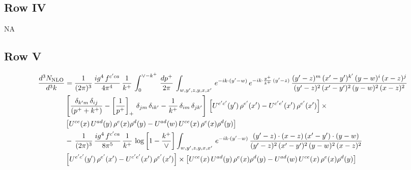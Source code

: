 \documentclass[9pt]{article}
\numberwithin{equation}{section}
\begin{document}
\subsection{Row IV}
\textsc{NA}
\subsection{Row V}
\begin{align}
    \frac{d^{3}N_{\rm NLO}}{d^{3}k} & = \frac{1}{(2\pi)^{3}}\, \frac{ig^{4}\,f^{c'ca}}{4\pi^{4}}\, \frac{1}{k^{+}}\,\int_{0}^{\vee-k^{+}}\, \frac{dp^{+}}{2\pi}\, \int_{w,y',z,y,x,x'}\, e^{-ik\cdot (y'-w)}\, e^{-ik\cdot \frac{p^{+}}{k^{+}}\,(y'-z)}\,\frac{(y'-z)^{m}\,(x'-y')^{k'}\,(y-w)^{i}\,(x-z)^{j}}{(y'-z)^{2}\,(x'-y')^{2}\,(y-w)^{2}\,(x-z)^{2}}\notag \\ & \left[\frac{\delta_{k'm}\,\delta_{ij}}{(p^{+}+k^{+})}-\left[\frac{1}{p^{+}}\right]_{+}\,\delta_{jm}\,\delta_{ik'}-\frac{1}{k^{+}}\, \delta_{im}\, \delta_{jk'}\right]\, \left[U^{e'c'}(y')\,\rho^{e'}(x')-U^{c'e'}(x')\,\rho^{e'}(x')\right]\times \notag \\ &  \left[U^{ce}(x)\,U^{ad}(y)\,\rho^{e}(x)\rho^{d}(y)-U^{ad}(w)\,U^{ce}(x)\,\rho^{e}(x)\rho^{d}(y)\right]\notag \\ & -\,\frac{1}{(2\pi)^{3}}\, \frac{ig^{4}\,f^{c'ca}}{8\pi^{5}}\, \frac{1}{k^{+}}\, \log{\left[1-\frac{k^{+}}{\vee}\right]} \int_{w,y',z,y,x,x'}\, e^{-ik\cdot (y'-w)}\,\frac{(y'-z)\cdot (x-z)\,(x'-y')\cdot (y-w)}{(y'-z)^{2}\,(x'-y')^{2}\,(y-w)^{2}\,(x-z)^{2}}\notag \\ & \left[U^{e'c'}(y')\,\rho^{e'}(x')-U^{c'e'}(x')\,\rho^{e'}(x')\right]\times  \left[U^{ce}(x)\,U^{ad}(y)\,\rho^{e}(x)\rho^{d}(y)-U^{ad}(w)\,U^{ce}(x)\,\rho^{e}(x)\rho^{d}(y)\right]
\end{align}
\end{document}
